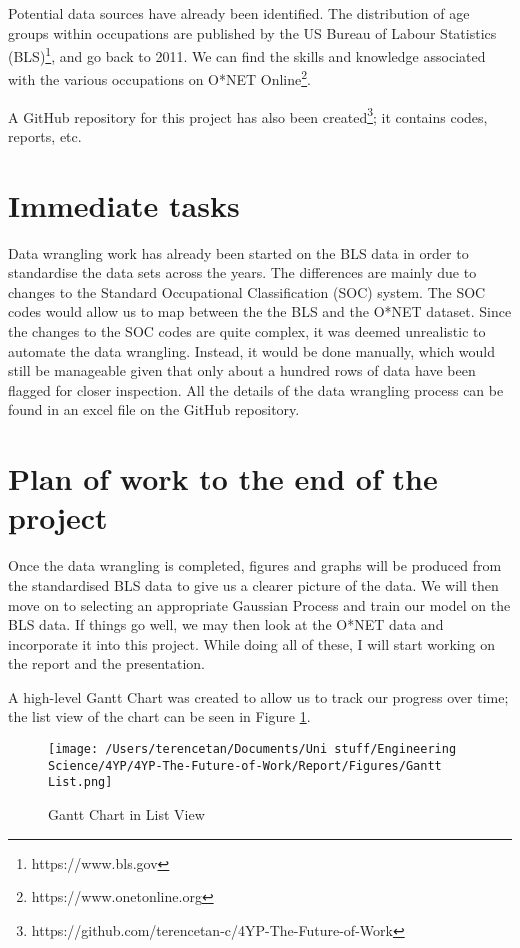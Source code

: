 \documentclass[11pt]{article}
\begin{document}
Potential data sources have already been identified. The distribution of age groups within occupations are published by the US Bureau of Labour Statistics (BLS)\footnote{https://www.bls.gov}, and go back to 2011. We can find the skills and knowledge associated with the various occupations on O*NET Online\footnote{https://www.onetonline.org}.

A GitHub repository for this project has also been created\footnote{https://github.com/terencetan-c/4YP-The-Future-of-Work}; it contains codes, reports, etc.


  

    
  \section{Immediate tasks}
  Data wrangling work has already been started on the BLS data in order to standardise the data sets across the years. The differences are mainly due to changes to the Standard Occupational Classification (SOC) system. The SOC codes would allow us to map between the the BLS and the O*NET dataset. Since the changes to the SOC codes are quite complex, it was deemed unrealistic to automate the data wrangling. Instead, it would be done manually, which would still be manageable given that only about a hundred rows of data have been flagged for closer inspection. All the details of the data wrangling process can be found in an excel file on the GitHub repository.

  \section{Plan of work to the end of the project}
  Once the data wrangling is completed, figures and graphs will be produced from the standardised BLS data to give us a clearer picture of the data. We will then move on to selecting an appropriate Gaussian Process and train our model on the BLS data. If things go well, we may then look at the O*NET data and incorporate it into this project. While doing all of these, I will start working on the report and the presentation.

  A high-level Gantt Chart was created to allow us to track our progress over time; the list view of the chart can be seen in Figure \ref{fig:gantt}.

  \begin{figure}[!htb]
    \centering
    \texttt{[image: /Users/terencetan/Documents/Uni stuff/Engineering Science/4YP/4YP-The-Future-of-Work/Report/Figures/Gantt List.png]}
    \caption{Gantt Chart in List View}
    \label{fig:gantt}

  \end{figure}

    \printbibliography[heading=bibintoc]
\end{document}
